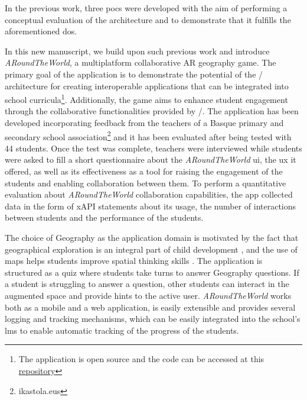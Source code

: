 \documentclass[pdflatex,sn-basic,iicol]{sn-jnl}%
\def\appname/{\textit{ARoundTheWorld}}
\def\numstudents/{44}
\begin{document}
In the previous work, three \glspl{poc} were developed with the aim of performing a conceptual evaluation of the architecture and to demonstrate that it fulfills the aforementioned \glspl{do}.

In this new manuscript, we build upon such previous work and introduce \appname/, a multiplatform collaborative AR geography game. The primary goal of the application is to demonstrate the potential of the \clear/ architecture for creating interoperable applications that can be integrated into school curricula\footnote{The application is open source and the code can be accessed at this \href{https://github.com/tv-vicomtech/ARoundtheworld}{repository}}. Additionally, the game aims to enhance student engagement through the collaborative functionalities provided by \clear/.
The application has been developed incorporating feedback from the teachers of a Basque primary and secondary school association\footnote{ikastola.eus} and it has been evaluated after being tested with \numstudents/ students.  Once the test was complete, teachers were interviewed while students were asked to fill a short questionnaire about the \appname/ \gls{ui}, the \gls{ux} it offered, as well as its effectiveness as a tool for raising the engagement of the students and enabling collaboration between them. To perform a quantitative evaluation about \appname/ collaboration capabilities, the app collected data \textendash{} in the form of xAPI statements \citep{xAPIspec} \textendash{} about its usage, the number of interactions between students and the performance of the students.

The choice of Geography as the application domain is motivated by the fact that geographical exploration is an integral part of child development \citep{catling1993whole}, and the use of maps helps students improve spatial thinking skills \citep{collins2018impact}. The application is structured as a quiz where students take turns to answer Geography questions. If a student is struggling to answer a question, other students can interact in the augmented space and provide hints to the active user. \appname/ works both as a mobile and a web application, is easily extensible and provides several logging and tracking mechanisms, which can be easily integrated into the school's \gls{lms} to enable automatic tracking of the progress of the students.
\end{document}
